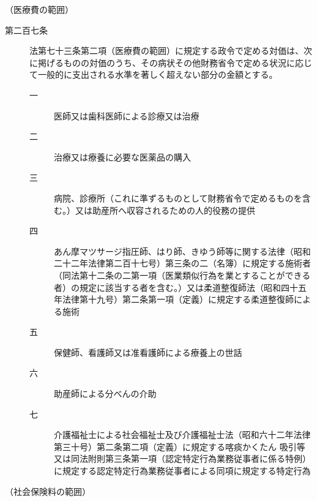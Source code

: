 \documentclass[twocolumn,a4j,10pt]{ltjtarticle}
\begin{document}
\noindent\hspace{10pt}（医療費の範囲）
\begin{description}
\item[第二百七条]法第七十三条第二項（医療費の範囲）に規定する政令で定める対価は、次に掲げるものの対価のうち、その病状その他財務省令で定める状況に応じて一般的に支出される水準を著しく超えない部分の金額とする。
\begin{description}
\item[一]医師又は歯科医師による診療又は治療
\item[二]治療又は療養に必要な医薬品の購入
\item[三]病院、診療所（これに準ずるものとして財務省令で定めるものを含む。）又は助産所へ収容されるための人的役務の提供
\item[四]あん摩マツサージ指圧師、はり師、きゆう師等に関する法律（昭和二十二年法律第二百十七号）第三条の二（名簿）に規定する施術者（同法第十二条の二第一項（医業類似行為を業とすることができる者）の規定に該当する者を含む。）又は柔道整復師法（昭和四十五年法律第十九号）第二条第一項（定義）に規定する柔道整復師による施術
\item[五]保健師、看護師又は准看護師による療養上の世話
\item[六]助産師による分べんの介助
\item[七]介護福祉士による社会福祉士及び介護福祉士法（昭和六十二年法律第三十号）第二条第二項（定義）に規定する喀痰かくたん
吸引等又は同法附則第三条第一項（認定特定行為業務従事者に係る特例）に規定する認定特定行為業務従事者による同項に規定する特定行為
\end{description}
\end{description}
\noindent\hspace{10pt}（社会保険料の範囲）
\end{document}
